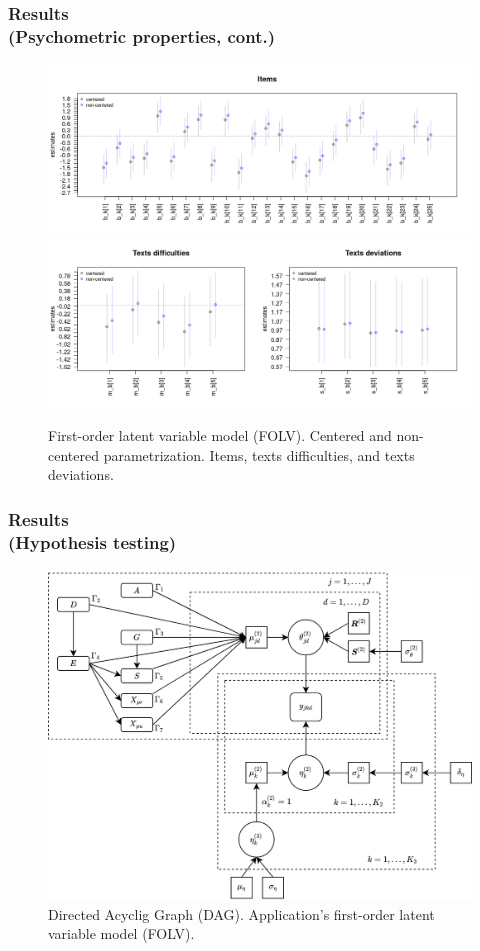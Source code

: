 \documentclass[nonav,sleutel]{beamer}
\begin{document}
	\begin{frame}
		\frametitle{Results \\
			(Psychometric properties, cont.)}
		\begin{figure}[H]
			\centering
			\includegraphics[width=0.70\linewidth]{FOLV_recovery_items}
			\includegraphics[width=0.69\linewidth]{FOLV_recovery_texts}
			\caption{First-order latent variable model (FOLV). Centered and non-centered parametrization. Items, texts difficulties, and texts deviations.}
			\label{fig:FOLV_CE.NC_recovery}
		\end{figure}
	\end{frame}
	\begin{frame}
		\frametitle{Results \\
			(Hypothesis testing)}
		\begin{figure}[H]
			\centering
			\includegraphics[width=0.75\linewidth]{app_FOLV_dag}
			\caption{Directed Acyclig Graph (DAG). Application’s first-order latent variable model (FOLV).}
			\label{fig:FOLV_app}
		\end{figure}
	\end{frame}
\end{document}
